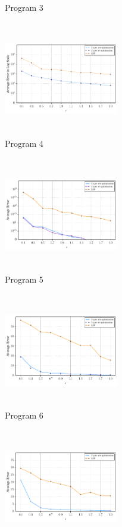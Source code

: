 \begin{figure}
\begin{subfigure}[b]{0.3\textwidth}
        \caption{Program 3}
        \label{fig:mouse}\end{subfigure}
          \begin{subfigure}[b]{0.3\textwidth}
    \qquad    \includegraphics[width=5cm,height=5cm]{test4.pdf}
        \caption{Program 4}
        \label{fig:mouse}\end{subfigure}
          \begin{subfigure}[b]{0.3\textwidth}
    \qquad    \includegraphics[width=5cm,height=5cm]{test5.pdf}
        \caption{Program 5}
        \label{fig:mouse}\end{subfigure}
          \begin{subfigure}[b]{0.3\textwidth}
    \qquad    \includegraphics[width=5cm,height=5cm]{test6.pdf}
        \caption{Program 6}
        \label{fig:mouse}\end{subfigure}
          \begin{subfigure}[b]{0.3\textwidth}
    \qquad    \includegraphics[width=5cm,height=5cm]{test7.pdf}

\end{subfigure}
\end{figure}

